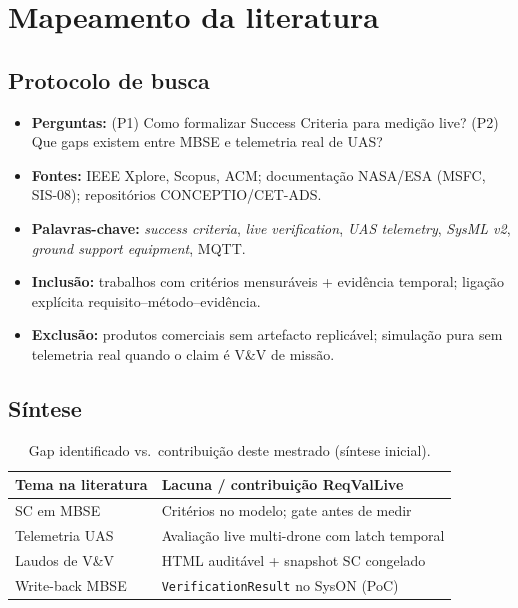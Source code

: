 \section{Mapeamento da literatura}
\label{sec:slr}

\subsection{Protocolo de busca}

\begin{itemize}
  \item \textbf{Perguntas:} (P1) Como formalizar Success Criteria para medição
        live? (P2) Que gaps existem entre MBSE e telemetria real de UAS?
  \item \textbf{Fontes:} IEEE Xplore, Scopus, ACM; documentação NASA/ESA (MSFC,
        SIS-08); repositórios CONCEPTIO/CET-ADS.
  \item \textbf{Palavras-chave:} \emph{success criteria}, \emph{live verification},
        \emph{UAS telemetry}, \emph{SysML v2}, \emph{ground support equipment}, MQTT.
  \item \textbf{Inclusão:} trabalhos com critérios mensuráveis + evidência temporal;
        ligação explícita requisito--método--evidência.
  \item \textbf{Exclusão:} produtos comerciais sem artefacto replicável; simulação
        pura sem telemetria real quando o claim é V\&V de missão.
\end{itemize}

\subsection{Síntese}

\begin{table}[htbp]
  \centering
  \caption{Gap identificado vs.\ contribuição deste mestrado (síntese inicial).}
  \label{tab:slr-gap}
  \begin{tabular}{@{}lp{5.5cm}@{}}
    \toprule
    Tema na literatura & Lacuna / contribuição ReqValLive \\
    \midrule
    SC em MBSE & Critérios no modelo; gate antes de medir \\
    Telemetria UAS & Avaliação live multi-drone com latch temporal \\
    Laudos de V\&V & HTML auditável + snapshot SC congelado \\
    Write-back MBSE & \texttt{VerificationResult} no SysON (PoC) \\
    \bottomrule
  \end{tabular}
\end{table}

